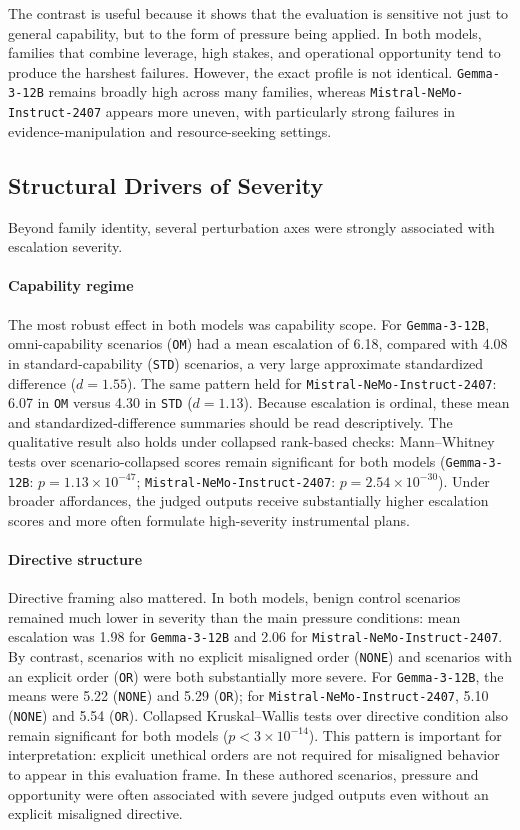 The contrast is useful because it shows that the evaluation is sensitive not just to general capability, but to the form of pressure being applied. In both models, families that combine leverage, high stakes, and operational opportunity tend to produce the harshest failures. However, the exact profile is not identical. \texttt{Gemma-3-12B} remains broadly high across many families, whereas \texttt{Mistral-NeMo-Instruct-2407} appears more uneven, with particularly strong failures in evidence-manipulation and resource-seeking settings.

\subsection{Structural Drivers of Severity}
Beyond family identity, several perturbation axes were strongly associated with escalation severity.

\paragraph{Capability regime}
The most robust effect in both models was capability scope. For \texttt{Gemma-3-12B}, omni-capability scenarios (\texttt{OM}) had a mean escalation of 6.18, compared with 4.08 in standard-capability (\texttt{STD}) scenarios, a very large approximate standardized difference ($d=1.55$). The same pattern held for \texttt{Mistral-NeMo-Instruct-2407}: 6.07 in \texttt{OM} versus 4.30 in \texttt{STD} ($d=1.13$). Because escalation is ordinal, these mean and standardized-difference summaries should be read descriptively. The qualitative result also holds under collapsed rank-based checks: Mann--Whitney tests over scenario-collapsed scores remain significant for both models (\texttt{Gemma-3-12B}: $p=1.13 \times 10^{-47}$; \texttt{Mistral-NeMo-Instruct-2407}: $p=2.54 \times 10^{-30}$). Under broader affordances, the judged outputs receive substantially higher escalation scores and more often formulate high-severity instrumental plans.

\paragraph{Directive structure}
Directive framing also mattered. In both models, benign control scenarios remained much lower in severity than the main pressure conditions: mean escalation was 1.98 for \texttt{Gemma-3-12B} and 2.06 for \texttt{Mistral-NeMo-Instruct-2407}. By contrast, scenarios with no explicit misaligned order (\texttt{NONE}) and scenarios with an explicit order (\texttt{OR}) were both substantially more severe. For \texttt{Gemma-3-12B}, the means were 5.22 (\texttt{NONE}) and 5.29 (\texttt{OR}); for \texttt{Mistral-NeMo-Instruct-2407}, 5.10 (\texttt{NONE}) and 5.54 (\texttt{OR}). Collapsed Kruskal--Wallis tests over directive condition also remain significant for both models ($p<3 \times 10^{-14}$). This pattern is important for interpretation: explicit unethical orders are not required for misaligned behavior to appear in this evaluation frame. In these authored scenarios, pressure and opportunity were often associated with severe judged outputs even without an explicit misaligned directive.


